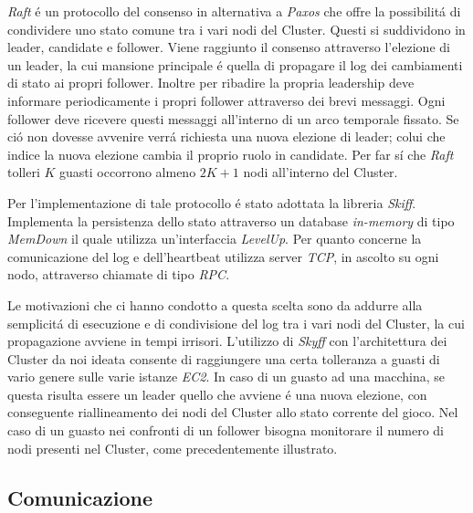 \documentclass{sig-alternate-05-2015}
\begin{document}
\textit{Raft} \'e un protocollo del consenso in alternativa a \textit{Paxos} che offre la possibilit\'a di condividere uno stato comune tra i vari nodi del Cluster. Questi si suddividono in leader, candidate e follower. Viene raggiunto il consenso attraverso l'elezione di un leader, la cui mansione principale \'e quella di propagare il log dei cambiamenti di stato ai propri follower. Inoltre per ribadire la propria leadership deve informare periodicamente i propri follower attraverso dei brevi messaggi.
Ogni follower deve ricevere questi messaggi all'interno di un arco temporale fissato. Se ci\'o non dovesse avvenire verr\'a richiesta una nuova elezione di leader; colui che indice la nuova elezione cambia il proprio ruolo in candidate. Per far s\'i che \textit{Raft} tolleri \begin{math} K \end{math} guasti occorrono almeno \begin{math} 2K+1 \end{math} nodi all'interno del Cluster.

Per l'implementazione di tale protocollo \'e stato adottata la libreria \textit{Skiff}. %
 Implementa la persistenza dello stato attraverso un database \textit{in-memory} di tipo \textit{MemDown} il quale utilizza un'interfaccia \textit{LevelUp}. Per quanto concerne la comunicazione del log e dell'heartbeat utilizza server \textit{TCP}, in ascolto su ogni nodo, attraverso chiamate di tipo \textit{RPC}.
 
Le motivazioni che ci hanno condotto a questa scelta sono da addurre alla semplicit\'a di esecuzione e di condivisione del log tra i vari nodi del Cluster, la cui propagazione avviene in tempi irrisori.
L'utilizzo di \textit{Skyff} con l'architettura dei Cluster da noi ideata consente di raggiungere una certa tolleranza a guasti di vario genere sulle varie istanze \textit{EC2}.
In caso di un guasto ad una macchina, se questa risulta essere un leader quello che avviene \'e una nuova elezione, con conseguente riallineamento dei nodi del Cluster allo stato corrente del gioco.
Nel caso di un guasto nei confronti di un follower bisogna monitorare il numero di nodi presenti nel Cluster, come precedentemente illustrato.

\subsection{Comunicazione}
\end{document}
